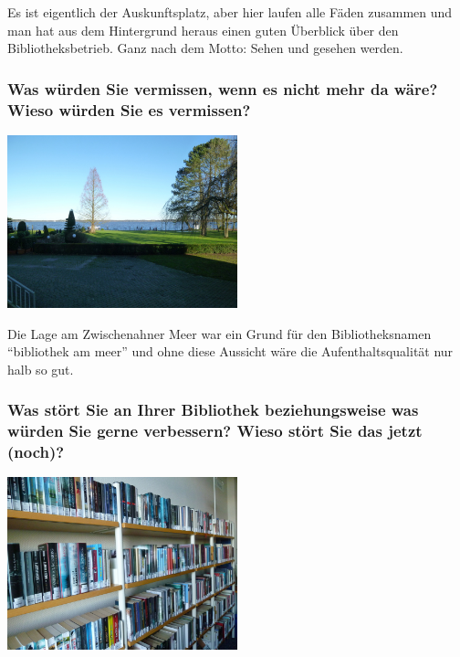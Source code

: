Es ist eigentlich der Auskunftsplatz, aber hier laufen alle Fäden
zusammen und man hat aus dem Hintergrund heraus einen guten Überblick
über den Bibliotheksbetrieb. Ganz nach dem Motto: Sehen und gesehen
werden.

\hypertarget{was-wuxfcrden-sie-vermissen-wenn-es-nicht-mehr-da-wuxe4re-wieso-wuxfcrden-sie-es-vermissen}{%
\subsubsection*{Was würden Sie vermissen, wenn es nicht mehr da wäre? Wieso
würden Sie es
vermissen?}\label{was-wuxfcrden-sie-vermissen-wenn-es-nicht-mehr-da-wuxe4re-wieso-wuxfcrden-sie-es-vermissen}}

\begin{center}
\includegraphics[width=0.5\textwidth]{am-meer/img/ausblick.jpg}
\end{center}

Die Lage am Zwischenahner Meer war ein Grund für den Bibliotheksnamen
\enquote{bibliothek am meer} und ohne diese Aussicht wäre die
Aufenthaltsqualität nur halb so gut.

\hypertarget{was-stuxf6rt-sie-an-ihrer-bibliothek-beziehungsweise-was-wuxfcrden-sie-gerne-verbessern-wieso-stuxf6rt-sie-das-jetzt-noch}{%
\subsubsection*{Was stört Sie an Ihrer Bibliothek beziehungsweise was würden
Sie gerne verbessern? Wieso stört Sie das jetzt
(noch)?}\label{was-stuxf6rt-sie-an-ihrer-bibliothek-beziehungsweise-was-wuxfcrden-sie-gerne-verbessern-wieso-stuxf6rt-sie-das-jetzt-noch}}

\begin{center}
\includegraphics[width=0.5\textwidth]{am-meer/img/platzmangel.jpg}
\end{center}

